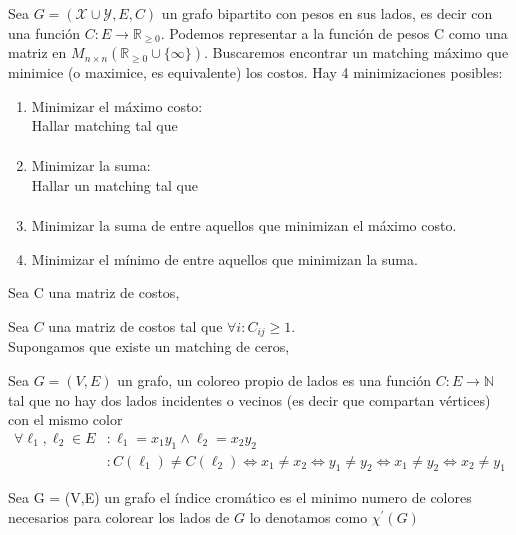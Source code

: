Sea $G = (\mathcal{X}\cup\mathcal{Y}, E, C)$ un grafo bipartito con pesos en sus lados, es decir con una función $C \colon E \to \mathbb{R}_{\ge 0}$.
Podemos representar a la función de pesos C como una matriz en $M_{n \times n}(\mathbb{R}_{\ge 0} \cup \{\infty\})$. Buscaremos encontrar un matching máximo que minimice (o maximice, es equivalente) los costos.
Hay 4 minimizaciones posibles:
\begin{enumerate}
    \item Minimizar el máximo costo: \\
    Hallar matching tal que\begin{align}
    [asd]
    \end{align}
    \item Minimizar la suma: \\
    Hallar un matching tal que 
    \begin{align}
        [fgh]
    \end{align}
    \item Minimizar la suma de entre aquellos que minimizan el máximo costo.
    \item Minimizar el mínimo de entre aquellos que minimizan la suma.
\end{enumerate}

\begin{definition}
Sea C una matriz de costos, 
\end{definition}
\begin{lemma}
Sea $C$ una matriz de costos tal que $\forall i: C_{ij} \ge 1$.\\Supongamos que existe un matching de ceros,
\end{lemma}

\begin{definition}
Sea $G = (V, E)$ un grafo, un coloreo propio de lados es una función $C : E \to \mathbb{N}$ tal que no hay dos lados incidentes o vecinos (es decir que compartan vértices) con el mismo color
\begin{align}
    \forall \ell_1, \ell_2 \in E &: \ell_1 = x_1 y_1 \wedge \ell_2 = x_2 y_2 \\
    &: C(\ell_1) \neq C(\ell_2) \iff x_1 \neq x_2 \iff y_1 \neq y_2 \iff x_1 \neq y_2 \iff x_2 \neq y_1
\end{align}
\end{definition}

\begin{definition}
Sea G = (V,E) un grafo el índice cromático es el minimo numero de colores necesarios para colorear los lados de $G$ lo denotamos como $\chi^{'}(G)$
\end{definition}

